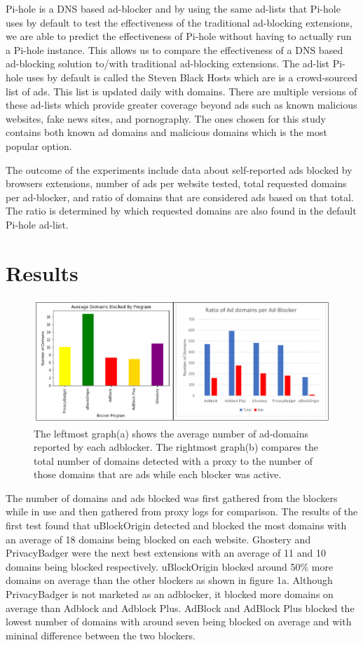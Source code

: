 \documentclass[sigsmall]{acmart}
\begin{document}
Pi-hole is a DNS based ad-blocker and by using the same ad-lists that Pi-hole uses by default to test the effectiveness of the traditional ad-blocking extensions, we are able to predict the effectiveness of Pi-hole without having to actually run a Pi-hole instance. This allows us to compare the effectiveness of a DNS based ad-blocking solution to/with traditional ad-blocking extensions. The ad-list Pi-hole uses by default is called the Steven Black Hosts which are is a crowd-sourced list of ads. This list is updated daily with domains. There are multiple versions of these ad-lists which provide greater coverage beyond ads such as known malicious websites, fake news sites, and pornography. The ones chosen for this study contains both known ad domains and malicious domains which is the most popular option.

The outcome of the experiments include data about self-reported ads blocked by browsers extensions, number of ads per website tested, total requested domains per ad-blocker, and ratio of domains that are considered ads based on that total. The ratio is determined by which requested domains are also found in the default Pi-hole ad-list.

\section*{Results}
\begin{figure}[h!]
  \includegraphics[scale = 0.75]{Edit3.png}
  \caption{ The leftmost graph(a) shows the average number of ad-domains reported by each adblocker. The rightmost graph(b) compares the total number of domains detected with a proxy to the number of those domains that are ads while each blocker was active.}
  \label{fig:graph1ab}
\end{figure}

The number of domains and ads blocked was first gathered from the blockers while in use and then gathered from proxy logs for comparison. The results of the first test found that uBlockOrigin detected and blocked the most domains with an average of 18 domains being blocked on each website. Ghostery and PrivacyBadger were the next best extensions with an average of 11 and 10 domains being blocked respectively. uBlockOrigin blocked around 50\% more domains on average than the other blockers as shown in figure 1a. Although PrivacyBadger is not marketed as an adblocker, it blocked more domains on average than Adblock and Adblock Plus. 
AdBlock and AdBlock Plus blocked the lowest number of domains with around seven being blocked on average and with mininal difference between the two blockers.  
 
\end{document}
